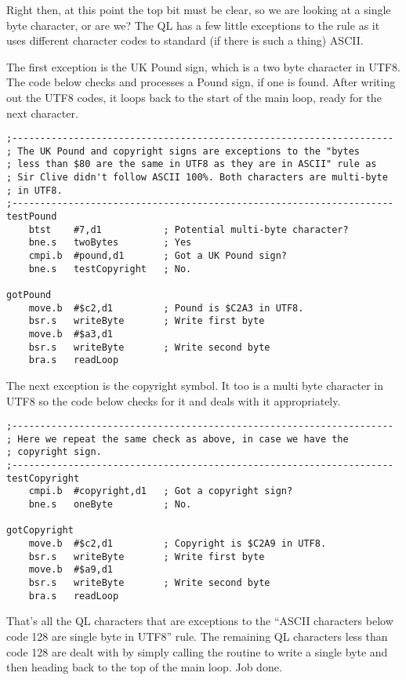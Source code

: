Right then, at this point the top bit must be clear, so we are looking
at a single byte character, or are we? The QL has a few little exceptions
to the rule as it uses different character codes to standard (if there
is such a thing) ASCII.

The first exception is the UK Pound sign, which is a two byte character
in UTF8. The code below checks and processes a Pound sign, if one
is found. After writing out the UTF8 codes, it loops back to the start
of the main loop, ready for the next character.

\begin{lstlisting}
;--------------------------------------------------------------------
; The UK Pound and copyright signs are exceptions to the "bytes 
; less than $80 are the same in UTF8 as they are in ASCII" rule as 
; Sir Clive didn't follow ASCII 100%. Both characters are multi-byte
; in UTF8.
;--------------------------------------------------------------------
testPound
    btst    #7,d1           ; Potential multi-byte character? 
    bne.s   twoBytes        ; Yes
    cmpi.b  #pound,d1       ; Got a UK Pound sign?
    bne.s   testCopyright   ; No.

gotPound
    move.b  #$c2,d1         ; Pound is $C2A3 in UTF8.
    bsr.s   writeByte       ; Write first byte
    move.b  #$a3,d1
    bsr.s   writeByte       ; Write second byte
    bra.s   readLoop
\end{lstlisting}

The next exception is the copyright symbol. It too is a multi byte
character in UTF8 so the code below checks for it and deals with it
appropriately.

\begin{lstlisting}
;--------------------------------------------------------------------
; Here we repeat the same check as above, in case we have the
; copyright sign.
;--------------------------------------------------------------------
testCopyright
    cmpi.b  #copyright,d1   ; Got a copyright sign?
    bne.s   oneByte         ; No.

gotCopyright
    move.b  #$c2,d1         ; Copyright is $C2A9 in UTF8.
    bsr.s   writeByte       ; Write first byte
    move.b  #$a9,d1
    bsr.s   writeByte       ; Write second byte
    bra.s   readLoop

\end{lstlisting}

That's all the QL characters that are exceptions to the ``ASCII characters
below code 128 are single byte in UTF8'' rule. The remaining QL characters
less than code 128 are dealt with by simply calling the routine to
write a single byte and then heading back to the top of the main loop.
Job done.


